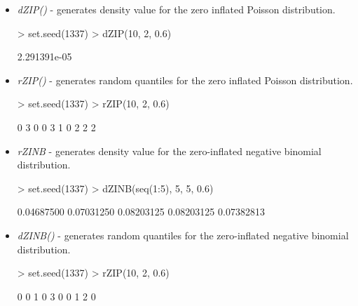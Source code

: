 \begin{itemize}
\item \textit{dZIP()} - generates density value for the zero inflated Poisson distribution.

{\bfseries
\begin{example}
> set.seed(1337)
> dZIP(10, 2, 0.6)
\end{example}
}
\begin{example}
[1] 2.291391e-05
\end{example}


\item \textit{rZIP()} - generates random quantiles for the zero inflated Poisson distribution.

{\bfseries
\begin{example}
> set.seed(1337)
> rZIP(10, 2, 0.6) 
\end{example}
}
\begin{example}
[1] 0 3 0 0 3 1 0 2 2 2
\end{example}


\item \textit{rZINB} - generates density value for the zero-inflated negative binomial distribution.

{\bfseries
\begin{example}
> set.seed(1337)
> dZINB(seq(1:5), 5, 5, 0.6)
\end{example}
}
\begin{example}
[1] 0.04687500 0.07031250 0.08203125 0.08203125 0.07382813
\end{example}


\item \textit{dZINB()} - generates random quantiles for the zero-inflated negative binomial distribution.

{\bfseries
\begin{example}
> set.seed(1337)
> rZIP(10, 2, 0.6) 
\end{example}
}
\begin{example}
[1] 0 0 1 0 3 0 0 1 2 0
\end{example}

\end{itemize}
